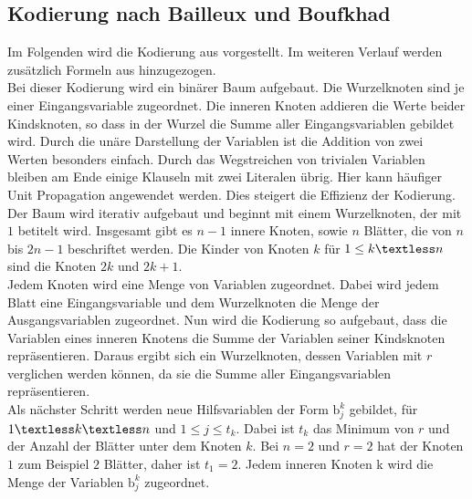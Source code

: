 \documentclass[a4,abstract=on]{scrartcl}
\begin{document}
	\subsection{Kodierung nach Bailleux und Boufkhad}
Im Folgenden wird die Kodierung aus \cite[][]{bailleux} vorgestellt. Im weiteren Verlauf werden zusätzlich Formeln aus \cite[][]{knuth} hinzugezogen.\\
Bei dieser Kodierung wird ein binärer Baum aufgebaut. Die Wurzelknoten sind je einer Eingangsvariable zugeordnet. Die inneren Knoten addieren die Werte beider Kindsknoten, so dass in der Wurzel die Summe aller Eingangsvariablen gebildet wird. Durch die unäre Darstellung der Variablen ist die Addition von zwei Werten besonders einfach. Durch das Wegstreichen von trivialen Variablen bleiben am Ende einige Klauseln mit zwei Literalen übrig. Hier kann häufiger Unit Propagation angewendet werden. Dies steigert die Effizienz der Kodierung.\\
Der Baum wird iterativ aufgebaut und beginnt mit einem Wurzelknoten, der mit $1$ betitelt wird. Insgesamt gibt es $n-1$ innere Knoten, sowie $n$ Blätter, die von $n$ bis $2n-1$ beschriftet werden. Die Kinder von Knoten $k$  für $1 \leq k \textless n$ sind die Knoten $2k$ und $2k +1$.\\
Jedem Knoten wird eine Menge von Variablen zugeordnet. Dabei wird jedem Blatt eine Eingangsvariable und dem Wurzelknoten die Menge der Ausgangsvariablen zugeordnet. Nun wird die Kodierung so aufgebaut, dass die Variablen eines inneren Knotens die Summe der Variablen seiner Kindsknoten repräsentieren. Daraus ergibt sich ein Wurzelknoten, dessen Variablen mit $r$ verglichen werden können, da sie die Summe aller Eingangsvariablen repräsentieren.\\
Als nächster Schritt werden neue Hilfsvariablen der Form $\text{b}_j^k$ gebildet, für $1 \textless k \textless n$ und  $1 \leq j \leq t_k$. Dabei ist $t_k$ das Minimum von $r$ und der Anzahl der Blätter unter dem Knoten $k$. Bei $n=2$ und $r=2$ hat der Knoten $1$ zum Beispiel $2$ Blätter, daher ist $t_1=2$. Jedem inneren Knoten k wird die Menge der Variablen $\text{b}_j^k$ zugeordnet.\\
\end{document}
